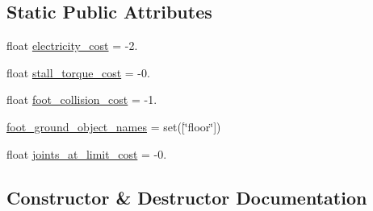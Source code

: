 \subsection*{Static Public Attributes}
\begin{DoxyCompactItemize}
\item 
float \hyperlink{classpybullet-gym_1_1pybulletgym_1_1envs_1_1roboschool_1_1envs_1_1locomotion_1_1walker__base__env_1_1_walker_base_bullet_env_ad9141252be174c30b9f48d1b30199e46}{electricity\+\_\+cost} = -\/2.
\item 
float \hyperlink{classpybullet-gym_1_1pybulletgym_1_1envs_1_1roboschool_1_1envs_1_1locomotion_1_1walker__base__env_1_1_walker_base_bullet_env_a5a5fea99744f99bf6491e5aa536f1abd}{stall\+\_\+torque\+\_\+cost} = -\/0.
\item 
float \hyperlink{classpybullet-gym_1_1pybulletgym_1_1envs_1_1roboschool_1_1envs_1_1locomotion_1_1walker__base__env_1_1_walker_base_bullet_env_a594679e9a4c132fec2a136647f38218b}{foot\+\_\+collision\+\_\+cost} = -\/1.
\item 
\hyperlink{classpybullet-gym_1_1pybulletgym_1_1envs_1_1roboschool_1_1envs_1_1locomotion_1_1walker__base__env_1_1_walker_base_bullet_env_a49a2065c0ff4f87933c8aaf78ff770df}{foot\+\_\+ground\+\_\+object\+\_\+names} = set(\mbox{[}\char`\"{}floor\char`\"{}\mbox{]})
\item 
float \hyperlink{classpybullet-gym_1_1pybulletgym_1_1envs_1_1roboschool_1_1envs_1_1locomotion_1_1walker__base__env_1_1_walker_base_bullet_env_ad1a4f38c0738f61c0ae38cfa00c99582}{joints\+\_\+at\+\_\+limit\+\_\+cost} = -\/0.
\end{DoxyCompactItemize}


\subsection{Constructor \& Destructor Documentation}
